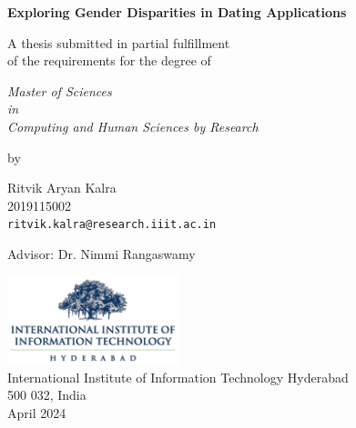 \thispagestyle{empty}
\begin{center}
\vspace*{1.5cm}
{\Large \bf Exploring Gender Disparities in Dating Applications}

\vspace*{2.2cm}
{\large A thesis submitted in partial fulfillment\\}
{\large  of the requirements for the degree of \\}

\vspace*{1cm}
{\it {\large  Master of Sciences} \\
{\large in\\}
{\large Computing and Human Sciences by Research\\}}

\vspace*{0.8cm}
{\large by}

\vspace*{6mm}
{\large Ritvik Aryan Kalra\\}
{\large 2019115002\\
{\small \tt ritvik.kalra@research.iiit.ac.in}}

\vspace*{5mm}
{\large Advisor: Dr. Nimmi Rangaswamy\\}


\vspace*{3.0cm}
{\includegraphics[width=5cm]{figures/iiit.png}\\}
{\large International Institute of Information Technology Hyderabad\\}
{\large 500 032, India\\}
\vspace*{5mm}
{\large April 2024\\}
\end{center}